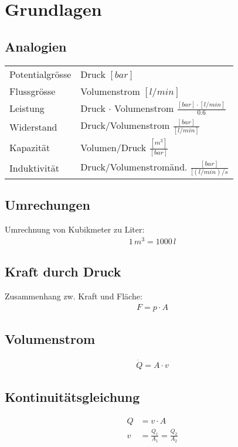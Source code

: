 \section{Grundlagen}
\subsection{Analogien}
\begin{tabular}{ll}
Potentialgrösse & Druck $[bar]$ \\
Flussgrösse & Volumenstrom $[l/min]$ \\
Leistung & Druck $\cdot$ Volumenstrom $\frac{[bar] \cdot [l/min]}{0.6}$ \\
Widerstand & Druck/Volumenstrom $\frac{[bar]}{[l/min]}$ \\
Kapazität & Volumen/Druck $\frac{[m^3]}{[bar]}$ \\
Induktivität & Druck/Volumenstromänd. $\frac{[bar]}{[(l/min)/s}$
\end{tabular}
\subsection{Umrechungen}
Umrechnung von Kubikmeter zu Liter:
\begin{align*}
1\, m^3 = 1000 \, l
\end{align*}

\subsection{Kraft durch Druck}
Zusammenhang zw. Kraft und Fläche:
\begin{align*}
F = p \cdot A \tag{Kraft = Druck*Fläche}
\end{align*}

\subsection{Volumenstrom}
\begin{align*}
\dot{Q} = A \cdot v
\end{align*}

\subsection{Kontinuitätsgleichung}
\begin{align*}
Q &= v \cdot A \tag{Massenerhalt} \\
v &= \frac{Q_1}{A_1} = \frac{Q_2}{A_2}
\end{align*}

